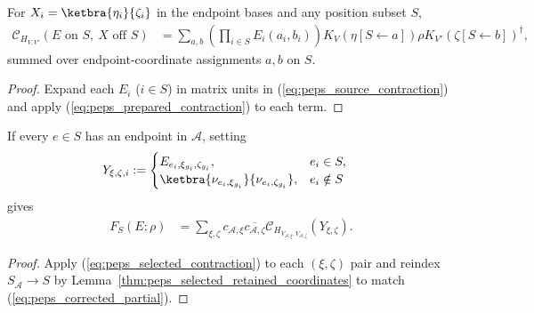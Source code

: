 \begin{lemma}
    \label{thm:peps_selected_source_contraction}
    \leanok
    For $X_i=\ketbra{\eta_i}{\zeta_i}$ in the endpoint bases and any position
    subset $S$,
    \begin{align}
        \mathcal C_{H_{V,V'}}(E\text{ on }S,\ X\text{ off }S)
         & =\sum_{a,b}\left(\prod_{i\in S}E_i(a_i,b_i)\right)
        K_V(\eta[S\leftarrow a])\rho
        K_{V'}(\zeta[S\leftarrow b])^\dagger,
        \label{eq:peps_selected_contraction}
    \end{align}
    summed over endpoint-coordinate assignments $a,b$ on $S$.
\end{lemma}
\begin{proof}
    \leanok
    Expand each $E_i$ ($i\in S$) in matrix units in (\ref{eq:peps_source_contraction})
    and apply (\ref{eq:peps_prepared_contraction}) to each term.
\end{proof}

\begin{lemma}
    \label{thm:peps_corrected_source_contraction}
    \leanok
    If every $e\in S$ has an endpoint in $\mathcal A$, setting
    \begin{align}
        Y_{\xi,\zeta,i}
         & :=\begin{cases}
                 E_{e_i,\xi_{g_i},\zeta_{g_i}},                       & e_i\in S,   \\
                 \ketbra{\nu_{e_i,\xi_{g_i}}}{\nu_{e_i,\zeta_{g_i}}}, & e_i\notin S
             \end{cases}
        \label{eq:peps_partial_corrected_sources}
    \end{align}
    gives
    \begin{align}
        F_S(E;\rho)
         & =\sum_{\xi,\zeta}c_{\mathcal A,\xi}\overline{c_{\mathcal A,\zeta}}
        \mathcal C_{H_{V_{\mathcal A,\xi},V_{\mathcal A,\zeta}}}
        (Y_{\xi,\zeta}).
        \label{eq:peps_corrected_contraction}
    \end{align}
\end{lemma}
\begin{proof}
    \leanok
    Apply (\ref{eq:peps_selected_contraction}) to each $(\xi,\zeta)$ pair and
    reindex $S_{\mathcal A}\to S$ by Lemma~\ref{thm:peps_selected_retained_coordinates}
    to match (\ref{eq:peps_corrected_partial}).
\end{proof}

